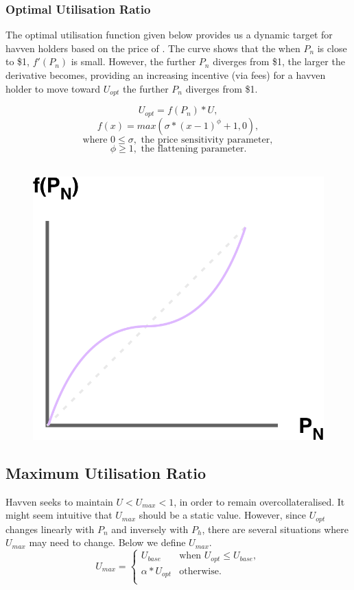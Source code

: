 \newpage
\subsubsection{Optimal Utilisation Ratio}

\noindent The optimal utilisation function given below provides us a dynamic target for havven holders based on the price of \NOM{}. The curve shows that the when $P_n$ is close to \$1, $ f'(P_n) $ is small. However, the further $P_n$ diverges from \$1, the larger the derivative becomes, providing an increasing incentive (via fees) for a havven holder to move toward $U_{opt}$ the further $P_n$ diverges from \$1.

$$ U_{opt} = f(P_n) * U,$$
$$ f(x) = max(\sigma * (x - 1)^{\phi} + 1, 0), $$
$$\text{where } 0 \leq \sigma, \text{ the price sensitivity parameter}, $$
$$\phi \geq 1, \text{ the flattening parameter}. $$ \\

\begin{figure}[h!]
    \centering
    \includegraphics[width=.5\textwidth]{img/U_opt}
\end{figure}

\newpage

\subsection{Maximum Utilisation Ratio}

\noindent Havven seeks to maintain $U < U_{max} < 1$, in order to remain overcollateralised. It might seem intuitive that $U_{max}$ should be a static value. However, since $U_{opt}$ changes linearly with $P_n$ and inversely with $P_h$, there are several situations where $U_{max}$ may need to change. Below we define $U_{max}$. \\

\[
U_{max} = 
\begin{cases}
 U_{base} &\mbox{when } U_{opt} \leq U_{base}, \\ 
 \alpha * U_{opt} &\mbox{otherwise}. \\
 \end{cases}
\]

